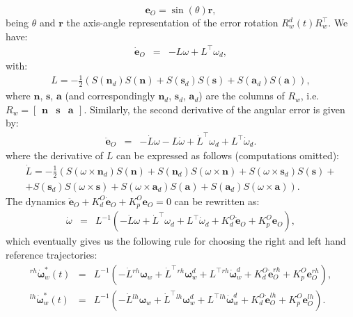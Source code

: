 \documentclass[12pt,a4paper,twoside]{article}
\begin{document}
$$
\bm e_O = \sin(\theta) \bm r,
$$
being $\theta$ and $\bm r$ the axis-angle representation of the error rotation $R^d_w(t) R_w^\top$. We have: 
\begin{eqnarray*} 
\dot {\bm e}_O & = & -L \omega + L^\top \omega_d,
\end{eqnarray*}
with:
\begin{eqnarray*} 
L = - \frac{1}{2} \left( S({\bm n_d}) S(\bm n) + S({\bm s}_d) S(\bm s) + S({\bm a}_d) S(\bm a) \right),
\end{eqnarray*}
where $\bm n$, $\bm s$, $\bm a$ (and correspondingly $\bm n_d$, $\bm s_d$, $\bm a_d$) are the columns of $R_w$, i.e. $R_w = \begin{bmatrix} \bm n & \bm s & \bm a \end{bmatrix}$. Similarly, the second derivative of the angular error is given by:
\begin{eqnarray*} 
\ddot {\bm e}_O & = & -\dot L \omega - L \dot \omega + \dot L^\top \omega_d + L^\top \dot \omega_d.
\end{eqnarray*}
where the derivative of $L$ can be expressed as follows (computations omitted):
\begin{multline*} 
\dot L = - \frac{1}{2} \left( S(\omega \times \mathbf n_d) S(\mathbf n) + S({\mathbf n_d}) S(\omega \times \mathbf n) + S(\omega \times \mathbf s_d) S(\mathbf s) + \right. \\ + \left. S({\mathbf s}_d) S(\omega \times \mathbf s) + S(\omega \times \mathbf a_d) S(\mathbf a) + S({\mathbf a}_d) S(\omega \times \mathbf a)\right).
\end{multline*}
The dynamics $\ddot {\bm e}_O + K_d^O \dot {\bm e}_O + K_p^O {\bm e}_O = 0$ can be rewritten as:
\begin{eqnarray*} 
\dot \omega & = & L^{-1} \left( -\dot L \omega  + \dot L^\top \omega_d + L^\top \dot \omega_d + K_d^O \dot {\bm e}_O + K_p^O {\bm e}_O \right),
\end{eqnarray*}
which eventually gives us the following rule for choosing the right and left hand reference trajectories:
\begin{eqnarray*} 
{}^{rh}{\dot {\bm \omega}}_w^* (t) & = & L^{-1} \left( -\dot L {}^{rh}{{\bm \omega}}_w  + \dot L^\top {}^{rh}{{\bm \omega}}_w^d + L^\top {}^{rh}{\dot {\bm \omega}}_w^d + K_d^O \dot {\bm e}_O^{rh} + K_p^O {\bm e}_O^{rh} \right), \\
{}^{lh}{\dot {\bm \omega}}_w^* (t) & = & L^{-1} \left( -\dot L {}^{lh}{{\bm \omega}}_w  + \dot L^\top {}^{lh}{{\bm \omega}}_w^d + L^\top {}^{lh}{\dot {\bm \omega}}_w^d + K_d^O \dot {\bm e}_O^{lh} + K_p^O {\bm e}_O^{lh} \right).
\end{eqnarray*}
\end{document}
